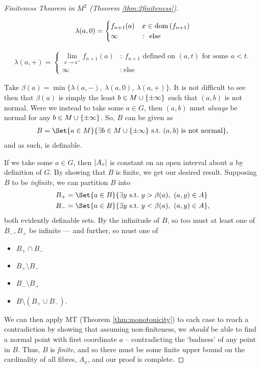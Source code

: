 \begin{proof}[Finiteness Theorem in $M^2$ (Theorem \ref{thm:2finiteness})]
\begin{description}
		\item
			\begin{align*}
						\lambda(a, 0) = \begin{cases}
									      f_{n + 1}(a) & x \in \dom{f_{n+1}} \\
									      \infty & \colon \ \textrm{else}
									   \end{cases}
			\end{align*}

		\item
			\begin{align*}
						\lambda(a, +) = \begin{cases}
									      \displaystyle\lim_{x \to a^{+}} f_{n + 1}(a) & \colon \ \textrm{$f_{n+1}$ defined on $(a, t)$ for some $a < t$.} \\
									      \infty & \colon \ \textrm{else}
									   \end{cases}
			\end{align*}
	\end{description}

	Take $\beta(a) = \min{\{ \lambda(a, -),\ \lambda(a, 0),\ \lambda(a, +) \}}$. It is not difficult to see then that $\beta(a)$ is simply the least $b \in M \cup \{ \pm \infty \}$ such that $(a, b)$ is not normal. Were we instead to take some $a \in G$, then $(a, b)$ must \emph{always} be normal for any $b \in M \cup \{ \pm \infty \}$. So, $B$ can be given as
	\begin{align*}
		B = \Set{a \in M}{\exists b \in \Minf \ \textrm{s.t.} \ (a, b) \ \textrm{is not normal}},
	\end{align*}
	and as such, is definable.

	If we take some $a \in G$, then $\vert A_x\vert$ is constant on an open interval about $a$ by definition of $G$. By showing that $B$ is finite, we get our desired result. Supposing $B$ to be \emph{infinite}, we can partition $B$ into
	\begin{align*}
		B_+ &= \Set{a \in B}{\exists y \ \textrm{s.t.} \ y > \beta(a), \ (a, y) \in A} \\
		B_- &= \Set{a \in B}{\exists y \ \textrm{s.t.} \ y < \beta(a), \ (a, y) \in A},
	\end{align*}
	both evidently definable sets. By the infinitude of $B$, so too must at least one of $B_-, B_+$ be infinite — and further, so must one of
	\begin{itemize}
		\item $B_+ \cap B_-$
		\item $B_+ \setminus B_-$
		\item $B_- \setminus B_+$
		\item $B \setminus (B_+ \cup B_-)$.
	\end{itemize}
	We can then apply MT (Theorem \ref{thm:monotonicity}) to each case to reach a contradiction by showing that assuming non-finiteness, we \emph{should} be able to find a normal point with first coordinate $a$ -- contradicting the `badness' of any point in $B$. Thus, $B$ is \emph{finite}, and so there must be some finite upper bound on the cardinality of all fibres, $A_x$, and our proof is complete.
\end{proof}
